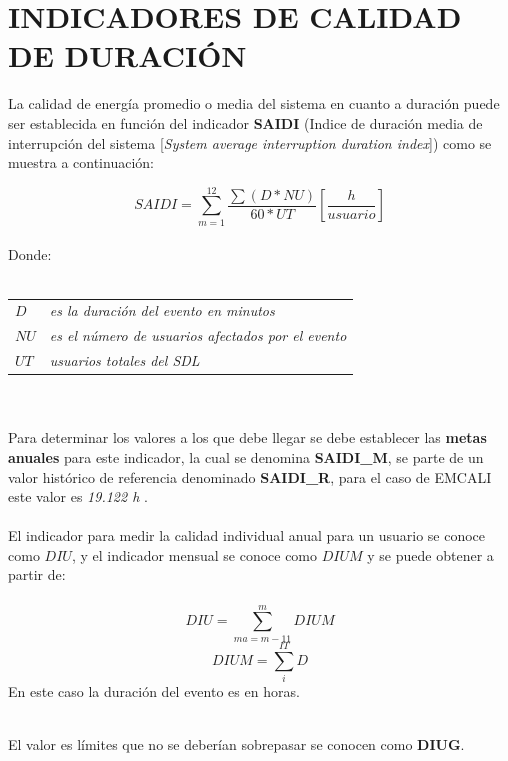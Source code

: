 \documentclass[a5paper]{book}%
\begin{document}
    \section{INDICADORES DE CALIDAD DE DURACIÓN}

    La calidad  de energía  promedio o media del sistema en cuanto a duración puede ser establecida en función del indicador \textbf{SAIDI} (Indice de duración media de interrupción del sistema [\textit{System average interruption duration index}]) como se muestra a continuación:

    \[ SAIDI  = \sum_{m=1}^{12}\dfrac{\sum(D*NU)}{60*UT}   \left[  \dfrac{h}{usuario} \right]  \]\\
    Donde:\\\\
    \begin{tabular}[H]{p{1cm}p{8cm}}
      
      $D$ & {\small\it es la duración del evento en minutos}\\
      $NU$ & {\small\it es el número de usuarios afectados por el evento} \\
      $UT$ &  {\small\it  usuarios totales del \ac{SDL}} \\
    \end{tabular} \\\\

    Para determinar los valores a los que debe llegar se debe establecer las \textbf{metas anuales} para este indicador,  la cual se denomina \textbf{SAIDI\_M},  se parte de un valor  histórico de referencia denominado \textbf{SAIDI\_R}, para el caso de EMCALI  este valor es \textit{19.122 h} \cite{CREG0282020}.\\\\
    
    El indicador para medir la calidad individual anual para un usuario se conoce  como $DIU$, y el indicador mensual se conoce como $DIUM$ y se puede obtener a partir de:\\\\


    \[ DIU = \sum_{ma=m-11}^{m}DIUM  \]
    \[ DIUM = \sum_{i}^{IT}D\]
    En este caso la  duración del evento es en horas.\\\
    
    El valor  es límites que no se deberían sobrepasar se conocen como \textbf{DIUG}.\\\\
\end{document}
